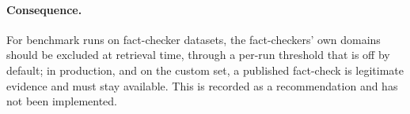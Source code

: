 \paragraph{Consequence.} For benchmark runs on fact-checker datasets,
the fact-checkers' own domains should be excluded at retrieval time,
through a per-run threshold that is off by default; in production, and
on the custom set, a published fact-check is legitimate evidence and
must stay available. This is recorded as a recommendation and has not
been implemented.
